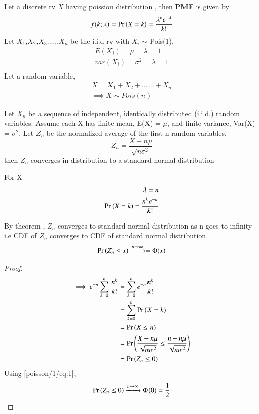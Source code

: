 
\begin{definition}
Let a discrete rv $X$ having poission distribution , then \textbf{PMF} is given by
\begin{align}
    f(k;\lambda) = \Pr\left(X = k\right) = \frac{\lambda^k e^{-\lambda}}{k!}
\end{align}
Let $X_1$,$X_2$,$X_3$......$X_n$ be the i.i.d rv  with $X_i$ $\sim$ Pois(1). 
\begin{align}
    E(X_i) = \mu = \lambda = 1\\
    var(X_i) = \sigma^2 = \lambda = 1\\
\end{align}
Let a random variable,
\begin{align}
    X = X_1 + X_2 + ...... + X_n\\
\implies X \sim Pois(n) 
\end{align}
\end{definition}

\begin{theorem}
Let $X_n$ be a sequence of independent, identically distributed (i.i.d.) random variables. Assume each X has finite mean, E(X) = $\mu$, and finite variance, Var(X) = $\sigma^2$. Let $Z_n$ be the normalized average of the first n random variables.
\begin{equation}
     Z_n = \frac{X - n \mu}{\sqrt{n \sigma^2}}
\end{equation}
 then $Z_n$ converges in distribution to a standard normal distribution
\end{theorem}
For X 
\begin{align}
    \lambda = n \\
    \Pr\left(X = k\right) = \frac{n^k e^{-n}}{k!}
\end{align}
\begin{corollary}
By theorem , $Z_n$ converges to standard normal distribution as n goes to infinity i.e CDF of $Z_n$ converges to CDF of standard normal distribution.
\begin{align}
    \Pr\left(Z_n \leq x\right) \xrightarrow{ n \rightarrow \infty} = \Phi(x) \label{poisson/1/eq:1}
\end{align}
\end{corollary}
\begin{proof}
\begin{align}
\implies e^{-n} \sum_{k=0}^{n} \frac{n^k}{k!} & = \sum_{k = 0}^{n} e^{-n}  \frac{n^k}{k!} \\
& = \sum_{k = 0}^{n} \Pr\left(X=k\right) \\
& = \Pr\left(X \leq n\right) \\
& = \Pr\left( \frac{X - n \mu}{\sqrt{n \sigma^2}} \leq \frac{n - n \mu}{\sqrt{n \sigma^2}}\right) \\
& = \Pr\left(Z_n \leq 0\right)
\end{align}
Using \eqref{poisson/1/eq:1},
\begin{align}
\Pr\left( Z_n \leq 0\right) \xrightarrow{n \rightarrow \infty} \Phi(0)
 = \frac{1}{2}
\end{align}
\end{proof}


